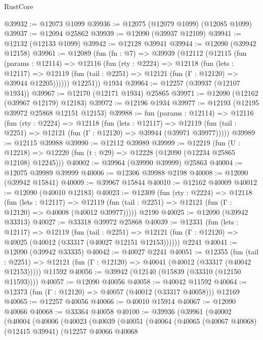 \begin{lexlean}{RustCore}
\begin{coremodule}
@39932 := @12073 @1099
@39936 := @12075 (@12079 @1099) (@12085 @1099)
@39937 := @12094 @25862
@39939 := @12090 (@39937 @12109)
@39941 := @12132 (@12133 @1099)
@39942 := @12128 @39941
@39944 := @12090 (@39942 @12158)
@39961 := @12089
    (fun (fn : @7) =>
    @39939
      (@12112
        (@12115
          (fun (params : @12114) =>
          @12116
            (fun (rty : @2224) =>
            @12118
              (fun (lets : @12117) =>
              @12119 (fun (tail : @2251) => @12121 (fun (Γ : @12120) => @39944 @12205))))))
        @12251))
    @1934
@39964 := @12257 (@39937 (@12107 @1934))
@39967 := @12170 (@12171 @1934) @25865
@39971 := @12090 (@12162 (@39967 @12179) @12183)
@39972 := @12196 @1934
@39977 := @12193 (@12195 @39972 @25868 @12151 @12153)
@39988 := fun (params : @12114) =>
  @12116
    (fun (rty : @2224) =>
    @12118
      (fun (lets : @12117) =>
      @12119 (fun (tail : @2251) => @12121 (fun (Γ : @12120) => @39944 (@39971 @39977)))))
@39989 := @12115 @39988
@39990 := @12112 @39989
@39999 := @12219
    (fun (U : @12218) => @12220 (fun (t : @29) => @12228 (@12090 (@12234 @25865 @12108) @12245)))
@40002 := @39964 (@39990 @39999) @25863
@40004 := @12075 @39989 @39999
@40006 := @12306 @39988 @2198
@40008 := @12090 (@39942 @15841)
@40009 := @39967 @15844
@40010 := @12162 @40009
@40012 := @12090 (@40010 @12183)
@40023 := @12309
    (fun (rty : @2224) =>
    @12118
      (fun (lets : @12117) =>
      @12119 (fun (tail : @2251) => @12121 (fun (Γ : @12120) => @40008 (@40012 @39977)))))
    @2190
@40025 := @12090 (@39942 @33313)
@40027 := @33318 @39972 @25868
@40039 := @12331
    (fun (lets : @12117) =>
    @12119
      (fun (tail : @2251) =>
      @12121 (fun (Γ : @12120) => @40025 (@40012 (@33317 (@40027 @12151 @12153))))))
    @2241
@40041 := @12090 (@39942 @33335)
@40042 := @40027 @2241
@40051 := @12355
    (fun (tail : @2251) => @12121 (fun (Γ : @12120) => @40041 (@40012 (@33317 (@40042 @12153)))))
    @11592
@40056 := @39942 (@12140 (@15839 (@33310 (@12150 @11593))))
@40057 := @12090 @40056
@40058 := @40042 @11592
@40064 := @12373 (fun (Γ : @12120) => @40057 (@40012 (@33317 @40058))) @12169
@40065 := @12257 @40056
@40066 := @40010 @15914
@40067 := @12090 @40066
@40068 := @33364 @40058
@40100 := @39936
    (@39961
      (@40002
        (@40004
          (@40006
            (@40023
              (@40039
                (@40051
                  (@40064
                    (@40065
                      (@40067 @40068)
                      (@12415 @39941)
                      (@12257
                        @40066
                        @40068

\end{coremodule}
\end{lexlean}
